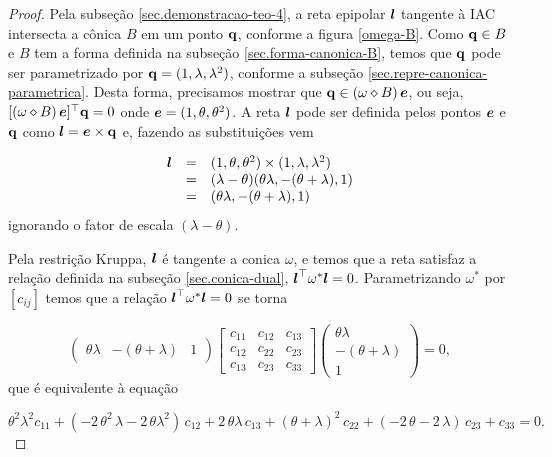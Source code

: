 \begin{proof}

Pela subseção \ref{sec.demonstracao-teo-4}, a reta epipolar $\boldsymbol{l}$ tangente à IAC intersecta a cônica $B$ em um ponto ${\bf q}$, conforme a figura \ref{omega-B}. Como ${\bf q}\in B$ e $B$ tem a forma definida na subseção \ref{sec.forma-canonica-B}, temos que ${\bf q}$ pode ser parametrizado por ${\bf q}=(1,\lambda,\lambda^2)$, conforme a subseção \ref{sec.repre-canonica-parametrica}. Desta forma, precisamos mostrar que ${\bf q}\in (\omega\diamond B)\,\boldsymbol{e}$, ou seja, $[(\omega\diamond B)\,\boldsymbol{e}]^\top {\bf q}=0$ onde $\boldsymbol{e}=(1,\theta,\theta^2)$. A reta $\boldsymbol{l}$ pode ser definida pelos pontos $\boldsymbol{e}$ e ${\bf q}$ como $\boldsymbol{l}=\boldsymbol{e}\times {\bf q}$ e, fazendo as substituições vem

\begin{equation*}
\begin{array}{rcl}
\boldsymbol{l}&=&(1,\theta ,\theta^2)\times (1,\lambda,\lambda^2)\\
&=&(\lambda -\theta)(\theta\lambda,-(\theta+\lambda),1)\\
&=&(\theta\lambda,-(\theta+\lambda),1)
\end{array}
\end{equation*}
ignorando o fator de escala $(\lambda-\theta)$.

Pela restrição Kruppa, $\boldsymbol{l}$ é tangente a conica $\omega$, e temos que a reta satisfaz a relação definida na subseção \ref{sec.conica-dual}, $\boldsymbol{l}^\top\omega^*\boldsymbol{l}=0$. Parametrizando $\omega^*$ por $[c_{ij}]$ temos que a relação $\boldsymbol{l}^\top\omega^*\boldsymbol{l}=0$ se torna

\begin{equation*}
\begin{pmatrix}
\theta\lambda&-(\theta+\lambda)&1
\end{pmatrix}
\begin{bmatrix}
c_{11}&c_{12}&c_{13}\\
c_{12}&c_{22}&c_{23}\\
c_{13}&c_{23}&c_{33}
\end{bmatrix}
\begin{pmatrix}
\theta\lambda\\
-(\theta+\lambda)\\
1
\end{pmatrix}
=0,
\end{equation*}  
que é equivalente à equação

\begin{equation}\label{eq.expandida-omega-dual}
\theta^2\lambda^2 c_{11}+(-2\,\theta^2\,\lambda-2\,\theta\lambda^2)\,c_{12}+2\,\theta\lambda\,c_{13}+(\theta+\lambda)^2\,c_{22}+(-2\,\theta-2\,\lambda)\,c_{23}+c_{33}=0.
\end{equation} 


\end{proof}
